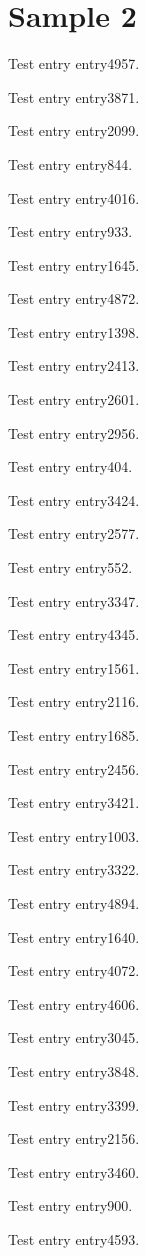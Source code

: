 \chapter{Sample 2}
Test entry \gls{entry4957}.

Test entry \gls{entry3871}.

Test entry \gls{entry2099}.

Test entry \gls{entry844}.

Test entry \gls{entry4016}.

Test entry \gls{entry933}.

Test entry \gls{entry1645}.

Test entry \gls{entry4872}.

Test entry \gls{entry1398}.

Test entry \gls{entry2413}.

Test entry \gls{entry2601}.

Test entry \gls{entry2956}.

Test entry \gls{entry404}.

Test entry \gls{entry3424}.

Test entry \gls{entry2577}.

Test entry \gls{entry552}.

Test entry \gls{entry3347}.

Test entry \gls{entry4345}.

Test entry \gls{entry1561}.

Test entry \gls{entry2116}.

Test entry \gls{entry1685}.

Test entry \gls{entry2456}.

Test entry \gls{entry3421}.

Test entry \gls{entry1003}.

Test entry \gls{entry3322}.

Test entry \gls{entry4894}.

Test entry \gls{entry1640}.

Test entry \gls{entry4072}.

Test entry \gls{entry4606}.

Test entry \gls{entry3045}.

Test entry \gls{entry3848}.

Test entry \gls{entry3399}.

Test entry \gls{entry2156}.

Test entry \gls{entry3460}.

Test entry \gls{entry900}.

Test entry \gls{entry4593}.

